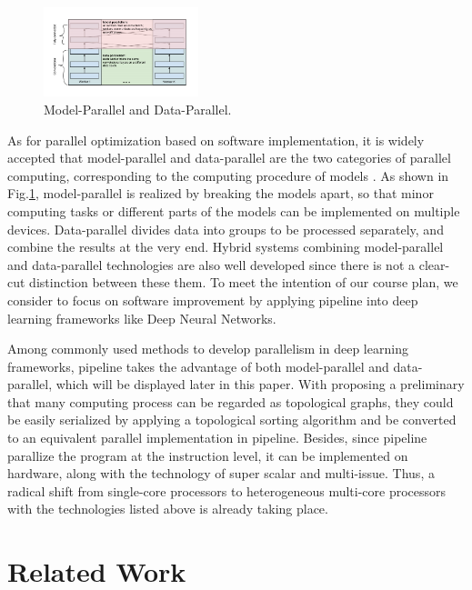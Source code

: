 \documentclass[conference]{IEEEtran}
\begin{document}
\begin{figure}[htbp]
\centerline{\includegraphics[width=0.4\textwidth]{model_data.png}}
\caption{Model-Parallel and Data-Parallel.\cite{r6}}
\label{fig_model}
\end{figure}

As for parallel optimization based on software implementation, it is widely accepted that model-parallel and data-parallel are the two categories of parallel computing, corresponding to the computing procedure of models \cite{in6}. As shown in Fig.\ref{fig_model}, model-parallel is realized by breaking the models apart, so that minor computing tasks or different parts of the models can be implemented on multiple devices. Data-parallel divides data into groups to be processed separately, and combine the results at the very end. Hybrid systems combining model-parallel and data-parallel technologies are also well developed since there is not a clear-cut distinction between these them. To meet the intention of our course plan, we consider to focus on software improvement by applying pipeline into deep learning frameworks like Deep Neural Networks.

Among commonly used methods to develop parallelism in deep learning frameworks, pipeline takes the advantage of both model-parallel and data-parallel, which will be displayed later in this paper. With proposing a preliminary that many computing process can be regarded as topological graphs, they could be easily serialized by applying a topological sorting algorithm and be converted to an equivalent parallel implementation in pipeline. Besides, since pipeline parallize the program at the instruction level, it can be implemented on hardware, along with the technology of super scalar and multi-issue. Thus, a radical shift from single-core processors to heterogeneous multi-core processors with the technologies listed above is already taking place. 

\section{Related Work}
\end{document}
